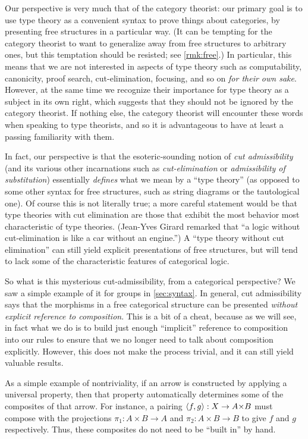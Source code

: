 Our perspective is very much that of the category theorist: our primary goal is to use type theory as a convenient syntax to prove things about categories, by presenting free structures in a particular way.
(It can be tempting for the category theorist to want to generalize away from free structures to arbitrary ones, but this temptation should be resisted; see \cref{rmk:free}.)
In particular, this means that we are not interested in aspects of type theory such as computability, canonicity, proof search, cut-elimination, focusing, and so on \emph{for their own sake}.
However, at the same time we recognize their importance for type theory as a subject in its own right, which suggests that they should not be ignored by the category theorist.
If nothing else, the category theorist will encounter these words when speaking to type theorists, and so it is advantageous to have at least a passing familiarity with them.

In fact, our perspective is that the esoteric-sounding notion of \emph{cut admissibility} (and its various other incarnations such as \emph{cut-elimination} or \emph{admissibility of substitution}) essentially \emph{defines} what we mean by a ``type theory'' (as opposed to some other syntax for free structures, such as string diagrams or the tautological one).
Of course this is not literally true; a more careful statement would be that type theories with cut elimination are those that exhibit the most behavior most characteristic of type theories.
(Jean-Yves Girard remarked that ``a logic without cut-elimination is like a car without an engine.'')
A ``type theory without cut elimination'' can still yield explicit presentations of free structures, but will tend to lack some of the characteristic features of categorical logic.

So what is this mysterious cut-admissibility, from a categorical perspective?
We saw a simple example of it for groups in \cref{sec:syntax}.
In general, cut admissibility says that the morphisms in a free categorical structure can be presented \emph{without explicit reference to composition}.
This is a bit of a cheat, because as we will see, in fact what we do is to build just enough ``implicit'' reference to composition into our rules to ensure that we no longer need to talk about composition explicitly.
However, this does not make the process trivial, and it can still yield valuable results.

As a simple example of nontriviality, if an arrow is constructed by applying a universal property, then that property automatically determines some of the composites of that arrow.
For instance, a pairing $\pair{f}{g}:X\to A\times B$ must compose with the projections $\pi_1:A\times B\to A$ and $\pi_2:A\times B\to B$ to give $f$ and $g$ respectively.
Thus, these composites do not need to be ``built in'' by hand.

